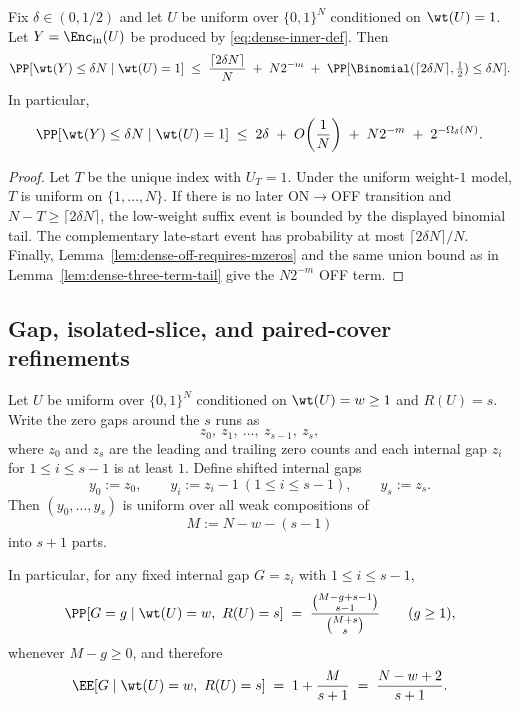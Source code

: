 \begin{corollary}
\label{cor:dense-inner-single-run}
Fix \(\delta\in(0,1/2)\) and let \(U\) be uniform over \(\{0,1\}^N\) conditioned on \(\wt(U)=1\).
Let \(Y=\Enc_{\mathrm{in}}(U)\) be produced by \eqref{eq:dense-inner-def}. Then
\begin{equation}
\label{eq:dense-inner-single-run}
\PP[\wt(Y)\le \delta N \mid \wt(U)=1]
\;\le\;
\frac{\lceil 2\delta N\rceil}{N}
\;+\;
N2^{-m}
\;+\;
\PP[\Binomial(\lceil 2\delta N\rceil,\tfrac12)\le \delta N].
\end{equation}
In particular,
\begin{equation}
\label{eq:dense-inner-single-run-asym}
\PP[\wt(Y)\le \delta N \mid \wt(U)=1]
\;\le\;
2\delta
\;+\;
O\!\left(\frac{1}{N}\right)
\;+\;
N2^{-m}
\;+\;
2^{-\Omega_\delta(N)}.
\end{equation}
\end{corollary}

\begin{proof}
Let \(T\) be the unique index with \(U_T=1\). Under the uniform weight-\(1\) model, \(T\) is uniform on \(\{1,\dots,N\}\).
If there is no later ON\(\to\)OFF transition and \(N-T\ge \lceil2\delta N\rceil\), the low-weight suffix event is bounded
by the displayed binomial tail. The complementary late-start event has probability at most \(\lceil2\delta N\rceil/N\).
Finally, Lemma~\ref{lem:dense-off-requires-mzeros} and the same union bound as in Lemma~\ref{lem:dense-three-term-tail}
give the \(N2^{-m}\) OFF term.
\end{proof}

\subsection{Gap, isolated-slice, and paired-cover refinements}
\begin{lemma}
\label{lem:gap-composition-given-runs}
Let $U$ be uniform over $\{0,1\}^N$ conditioned on $\wt(U)=w\ge 1$ and $R(U)=s$.
Write the zero gaps around the $s$ runs as
\[
z_0,\ z_1,\ \dots,\ z_{s-1},\ z_s,
\]
where $z_0$ and $z_s$ are the leading and trailing zero counts and each internal gap $z_i$ for
$1\le i\le s-1$ is at least $1$. Define shifted internal gaps
\[
y_0:=z_0,\qquad y_i:=z_i-1 \ (1\le i\le s-1),\qquad y_s:=z_s.
\]
Then $(y_0,\dots,y_s)$ is uniform over all weak compositions of
\[
M:=N-w-(s-1)
\]
into $s+1$ parts.

In particular, for any fixed internal gap $G=z_i$ with $1\le i\le s-1$,
\begin{equation}
\label{eq:internal-gap-marginal}
\PP[G=g \mid \wt(U)=w,\ R(U)=s]
\;=\;
\frac{\binom{M-g+s-1}{s-1}}{\binom{M+s}{s}}
\qquad (g\ge 1),
\end{equation}
whenever $M-g\ge 0$, and therefore
\begin{equation}
\label{eq:internal-gap-mean}
\EE[G \mid \wt(U)=w,\ R(U)=s]
\;=\;
1+\frac{M}{s+1}
\;=\;
\frac{N-w+2}{s+1}.
\end{equation}
\end{lemma}

